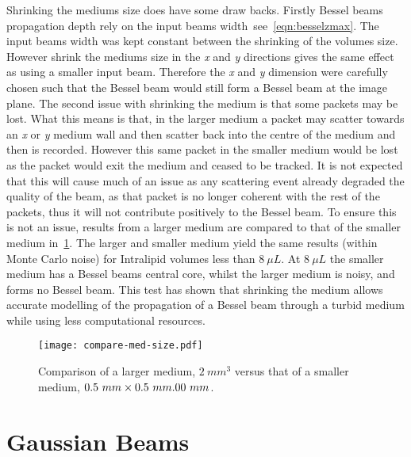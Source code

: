 Shrinking the mediums size does have some draw backs.
Firstly Bessel beams propagation depth rely on the input beams width\ see~\cref{eqn:besselzmax}.
The input beams width was kept constant between the shrinking of the volumes size.
However shrink the mediums size in the \textit{x} and \textit{y} directions gives the same effect as using a smaller input beam.
Therefore the \textit{x} and \textit{y} dimension were carefully chosen such that the Bessel beam would still form a Bessel beam at the image plane.
The second issue with shrinking the medium is that some packets may be lost.
What this means is that, in the larger medium a packet may scatter towards an \textit{x} or \textit{y} medium wall and then scatter back into the centre of the medium and then is recorded.
However this same packet in the smaller medium would be lost as the packet would exit the medium and ceased to be tracked.
It is not expected that this will cause much of an issue as any scattering event already degraded the quality of the beam, as that packet is no longer coherent with the rest of the packets, thus it will not contribute positively to the Bessel beam.
To ensure this is not an issue, results from a larger medium are compared to that of the smaller medium in~\cref{fig:compareBigSmall}.
The larger and smaller medium yield the same results (within Monte Carlo noise) for Intralipid volumes less than $8~\mu L$.
At $8~\mu L$ the smaller medium has a Bessel beams central core, whilst the larger medium is noisy, and forms no Bessel beam.
This test has shown that shrinking the medium allows accurate modelling of the propagation of a Bessel beam through a turbid medium while using less computational resources.

\begin{figure}[!ht]
    \centering
    \texttt{[image: compare-med-size.pdf]}
    \caption{Comparison of a larger medium, $2~mm^3$ versus that of a smaller medium, $0.5~mm \times 0.5~mm \time 2.00~mm$.}
    \label{fig:compareBigSmall}
\end{figure}

\FloatBarrier

\section{Gaussian Beams}

% 

